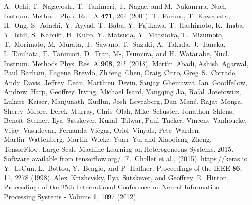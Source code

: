 \documentclass{jps-cp}
\begin{document}
\begin{thebibliography}{9}
  A.~Ochi, T.~Nagayoshi, T.~Tanimori, T.~Nagae, and M.~Nakamura,
  Nucl. Instrum. Methods Phys. Res. A \textbf{471}, 264 (2001).
  T.~Furuno, T.~Kawabata, H.~Ong, S.~Adachi, Y.~Ayyad, T.~Baba, Y.~Fujikawa, T.~Hashimoto, K.~Inaba, Y.~Ishii,
  S.~Kabuki, H.~Kubo, Y.~Matsuda, Y.~Matsuoka, T.~Mizumoto, T.~Morimoto, M.~Murata, T.~Sawano, T.~Suzuki, A.~Takada,
  J.~Tanaka, I.~Tanihata, T.~Tanimori, D.~Tran, M-, Tsumura, and H.~Watanabe,
  Nucl. Instrum. Methods Phys. Res. A \textbf{908}, 215 (2018).
  Mart\'{\i}n~Abadi,
  Ashish~Agarwal,
  Paul~Barham,
  Eugene~Brevdo,
  Zhifeng~Chen,
  Craig~Citro,
  Greg~S.~Corrado,
  Andy~Davis,
  Jeffrey~Dean,
  Matthieu~Devin,
  Sanjay~Ghemawat,
  Ian~Goodfellow,
  Andrew~Harp,
  Geoffrey~Irving,
  Michael~Isard,
  Yangqing Jia,
  Rafal~Jozefowicz,
  Lukasz~Kaiser,
  Manjunath~Kudlur,
  Josh~Levenberg,
  Dan~Man\'{e},
  Rajat~Monga,
  Sherry~Moore,
  Derek~Murray,
  Chris~Olah,
  Mike~Schuster,
  Jonathon~Shlens,
  Benoit~Steiner,
  Ilya~Sutskever,
  Kunal~Talwar,
  Paul~Tucker,
  Vincent~Vanhoucke,
  Vijay~Vasudevan,
  Fernanda~Vi\'{e}gas,
  Oriol~Vinyals,
  Pete~Warden,
  Martin~Wattenberg,
  Martin~Wicke,
  Yuan~Yu, and
  Xiaoqiang~Zheng.
  {{TensorFlow}: Large-Scale Machine Learning on Heterogeneous Systems},
  2015.
  Software available from \url{tensorflow.org/}.
  F.~Chollet et al., (2015). \url{https://keras.io}
  Y.~LeCun, L.~Bottou, Y.~Bengio, and P.~Haffner,
  Proceedings of the IEEE \textbf{86}, 11, 2278 (1998).
  Alex~Krizhevsky, Ilya~Sutskever, and Geoffrey~E.~Hinton,
  Proceedings of the 25th International Conference on Neural Information Processing Systems - Volume \textbf{1}, 1097 (2012).
%
  
\end{thebibliography}
\end{document}
